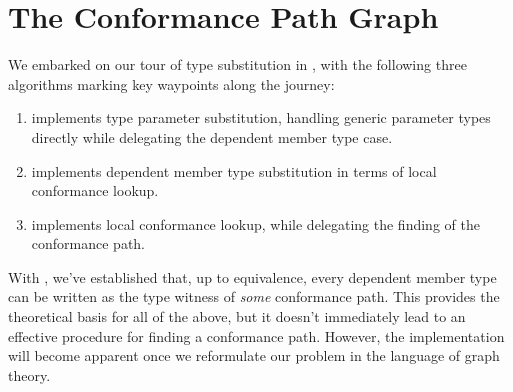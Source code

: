 \documentclass[../generics]{subfiles}
\begin{document}
\section{The Conformance Path Graph}\label{finding conformance paths}

We embarked on our tour of type substitution in , with the following three algorithms marking key waypoints along the journey:
\begin{enumerate}
\item {} implements type parameter substitution, handling generic parameter types directly while delegating the dependent member type case.
\item {} implements dependent member type substitution in terms of local conformance lookup.
\item {} implements local conformance lookup, while delegating the finding of the conformance path.
\end{enumerate}
With , we've established that, up to equivalence, every dependent member type can be written as the type witness of \emph{some} conformance path. This provides the theoretical basis for all of the above, but it doesn't immediately lead to an effective procedure for finding a conformance path. However, the implementation will become apparent once we reformulate our problem in the language of graph theory.
\end{document}

